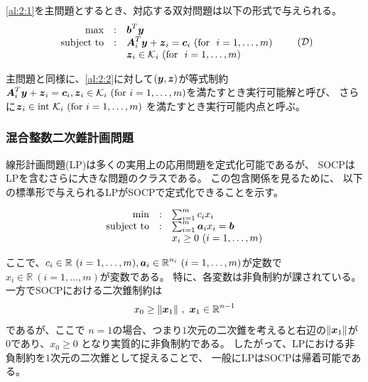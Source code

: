 \documentclass[11pt,a4paper,dvipdfmx,titlepage,uplatex]{jsarticle}
\theoremstyle{mystyle}
\newcommand{\0}{\mathbf{0}}
\def\a{\mbox{\boldmath $a$}}
\def\b{\mbox{\boldmath $b$}}
\def\c{\mbox{\boldmath $c$}}
\def\x{\mbox{\boldmath $x$}}
\def\y{\mbox{\boldmath $y$}}
\def\z{\mbox{\boldmath $z$}}
\def\A{\mbox{\boldmath $A$}}
\def\DC{\mbox{$\cal D$}}
\def\KC{\mbox{$\cal K$}}
\def\Real{\mbox{$\mathbb{R}$}}
\begin{document}
\eqref{al:2:1}を主問題とするとき、対応する双対問題は以下の形式で与えられる。
\begin{align}
\begin{array}{rcl}
\max & : & \b^T \y \\
    \text{subject to} & : & \A_i^T \y + \z_i =  \c_i \ (\text{for} \ \ i = 1, \dots , m) \\
     & & \z_i \in \KC_i \ (\text{for} \ \ i = 1, \dots , m)
\end{array}
\tag{$\DC$}
\label{al:2:2}
\end{align}

主問題と同様に、\eqref{al:2:2}に対して$(\y,\z)$が等式制約$\A_i^T \y + \z_i =  \c_i, \z_i \in \KC_i \
(\text{for} \ i= 1, \dots , m)$を満たすとき実行可能解と呼び、
さらに$\z_i \in \text{int} \ \KC_i \ (\text{for} \ i = 1, \dots , m)$
を満たすとき実行可能内点と呼ぶ。

\subsubsection{混合整数二次錐計画問題}\label{sec:Second_Order_Cone_Programming:application}

線形計画問題(LP)は多くの実用上の応用問題を定式化可能であるが、
SOCPはLPを含むさらに大きな問題のクラスである。
この包含関係を見るために、
以下の標準形で与えられるLPがSOCPで定式化できることを示す。

\begin{align}
  \begin{array}{rcl}
    \min & : & \sum_{i=1}^{m} c_i x_i \\
    \text{subject to} & : & \sum_{i=1}^m \a_i x_i = \b \\
    & & x_i \ge 0 \ (i = 1, \dots , m)
  \end{array}
\end{align}

ここで、$c_i \in \Real \ (i = 1 , \dots , m) , \a_i \in \Real^{n_i} \ (i = 1 , \dots , m)$が定数で$x_i \in \Real \ (i = 1 , \dots , m)$が変数である。
特に、各変数は非負制約が課されている。
一方でSOCPにおける二次錐制約は
\begin{align}
  x_0 \ge \|\x_1\| \ , \ \x_1 \in \Real^{n-1}
\end{align}
であるが、ここで $n=1$の場合、つまり$1$次元の二次錐を考えると右辺の$\|\x_1\|$が
$0$であり、$x_0 \ge 0$ となり実質的に非負制約である。
したがって、LPにおける非負制約を$1$次元の二次錐として捉えることで、
一般にLPはSOCPは帰着可能である。
\end{document}
